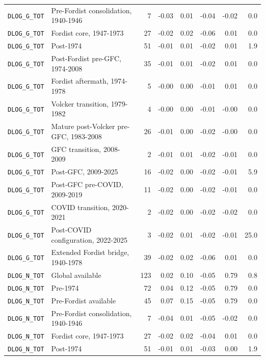 \begin{landscape}
\begin{longtable}{p{4.4cm}p{3.8cm}rrrrrr}
\\
\nolinkurl{DLOG_G_TOT} & Pre-Fordist consolidation, 1940-1946 & 7 & -0.03 & 0.01 & -0.04 & -0.02 & 0.0
\\
\nolinkurl{DLOG_G_TOT} & Fordist core, 1947-1973 & 27 & -0.02 & 0.02 & -0.06 & 0.01 & 0.0
\\
\nolinkurl{DLOG_G_TOT} & Post-1974 & 51 & -0.01 & 0.01 & -0.02 & 0.01 & 1.9
\\
\nolinkurl{DLOG_G_TOT} & Post-Fordist pre-GFC, 1974-2008 & 35 & -0.01 & 0.01 & -0.02 & 0.01 & 0.0
\\
\nolinkurl{DLOG_G_TOT} & Fordist aftermath, 1974-1978 & 5 & -0.00 & 0.00 & -0.01 & 0.01 & 0.0
\\
\nolinkurl{DLOG_G_TOT} & Volcker transition, 1979-1982 & 4 & -0.00 & 0.00 & -0.01 & -0.00 & 0.0
\\
\nolinkurl{DLOG_G_TOT} & Mature post-Volcker pre-GFC, 1983-2008 & 26 & -0.01 & 0.00 & -0.02 & -0.00 & 0.0
\\
\nolinkurl{DLOG_G_TOT} & GFC transition, 2008-2009 & 2 & -0.01 & 0.01 & -0.02 & -0.01 & 0.0
\\
\nolinkurl{DLOG_G_TOT} & Post-GFC, 2009-2025 & 16 & -0.02 & 0.00 & -0.02 & -0.01 & 5.9
\\
\nolinkurl{DLOG_G_TOT} & Post-GFC pre-COVID, 2009-2019 & 11 & -0.02 & 0.00 & -0.02 & -0.01 & 0.0
\\
\nolinkurl{DLOG_G_TOT} & COVID transition, 2020-2021 & 2 & -0.02 & 0.00 & -0.02 & -0.02 & 0.0
\\
\nolinkurl{DLOG_G_TOT} & Post-COVID configuration, 2022-2025 & 3 & -0.02 & 0.01 & -0.02 & -0.01 & 25.0
\\
\nolinkurl{DLOG_G_TOT} & Extended Fordist bridge, 1940-1978 & 39 & -0.02 & 0.02 & -0.06 & 0.01 & 0.0
\\
\nolinkurl{DLOG_N_TOT} & Global available & 123 & 0.02 & 0.10 & -0.05 & 0.79 & 0.8
\\
\nolinkurl{DLOG_N_TOT} & Pre-1974 & 72 & 0.04 & 0.12 & -0.05 & 0.79 & 0.0
\\
\nolinkurl{DLOG_N_TOT} & Pre-Fordist available & 45 & 0.07 & 0.15 & -0.05 & 0.79 & 0.0
\\
\nolinkurl{DLOG_N_TOT} & Pre-Fordist consolidation, 1940-1946 & 7 & -0.04 & 0.01 & -0.05 & -0.02 & 0.0
\\
\nolinkurl{DLOG_N_TOT} & Fordist core, 1947-1973 & 27 & -0.02 & 0.02 & -0.04 & 0.01 & 0.0
\\
\nolinkurl{DLOG_N_TOT} & Post-1974 & 51 & -0.01 & 0.01 & -0.03 & 0.00 & 1.9
\\

\end{longtable}
\end{landscape}
